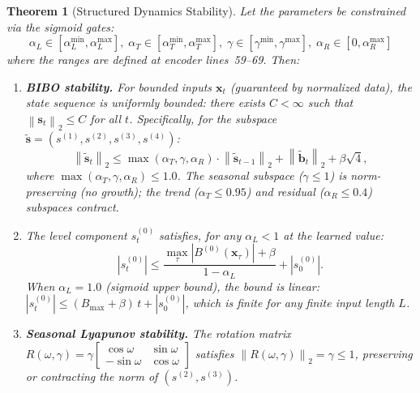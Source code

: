 \documentclass[11pt]{article}
\newtheorem{theorem}{Theorem}[section]
\newcommand{\norm}[1]{\left\lVert#1\right\rVert}
\begin{document}
\begin{theorem}[Structured Dynamics Stability]\label{thm:stability}
Let the parameters be constrained via the sigmoid gates:
\[
\alpha_L \in [\alpha_L^{\min}, \alpha_L^{\max}],\;
\alpha_T \in [\alpha_T^{\min}, \alpha_T^{\max}],\;
\gamma \in [\gamma^{\min}, \gamma^{\max}],\;
\alpha_R \in [0, \alpha_R^{\max}]
\]
where the ranges are defined at encoder lines~59--69. Then:
\begin{enumerate}
    \item[(a)] \textbf{BIBO stability.} For bounded inputs $\mathbf{x}_t$ (guaranteed by normalized data), the state sequence is uniformly bounded: there exists $C < \infty$ such that $\norm{\mathbf{s}_t}_2 \leq C$ for all $t$. Specifically, for the subspace $\tilde{\mathbf{s}} = (s^{(1)}, s^{(2)}, s^{(3)}, s^{(4)})$:
    \[
    \norm{\tilde{\mathbf{s}}_t}_2 \leq \max(\alpha_T, \gamma, \alpha_R) \cdot \norm{\tilde{\mathbf{s}}_{t-1}}_2 + \norm{\tilde{\mathbf{b}}_t}_2 + \beta\sqrt{4},
    \]
    where $\max(\alpha_T, \gamma, \alpha_R) \leq 1.0$. The seasonal subspace ($\gamma \leq 1$) is norm-preserving (no growth); the trend ($\alpha_T \leq 0.95$) and residual ($\alpha_R \leq 0.4$) subspaces contract.

    \item[(b)] The level component $s_t^{(0)}$ satisfies, for any $\alpha_L < 1$ at the learned value:
    \[
    |s_t^{(0)}| \leq \frac{\max_\tau |B^{(0)}(\mathbf{x}_\tau)| + \beta}{1 - \alpha_L} + |s_0^{(0)}|.
    \]
    When $\alpha_L = 1.0$ (sigmoid upper bound), the bound is linear: $|s_t^{(0)}| \leq (B_{\max} + \beta)\,t + |s_0^{(0)}|$, which is finite for any finite input length $L$.

    \item[(c)] \textbf{Seasonal Lyapunov stability.} The rotation matrix $R(\omega,\gamma) = \gamma\begin{bmatrix} \cos\omega & \sin\omega \\ -\sin\omega & \cos\omega \end{bmatrix}$ satisfies $\norm{R(\omega,\gamma)}_2 = \gamma \leq 1$, preserving or contracting the norm of $(s^{(2)}, s^{(3)})$.
\end{enumerate}
\end{theorem}
\end{document}
